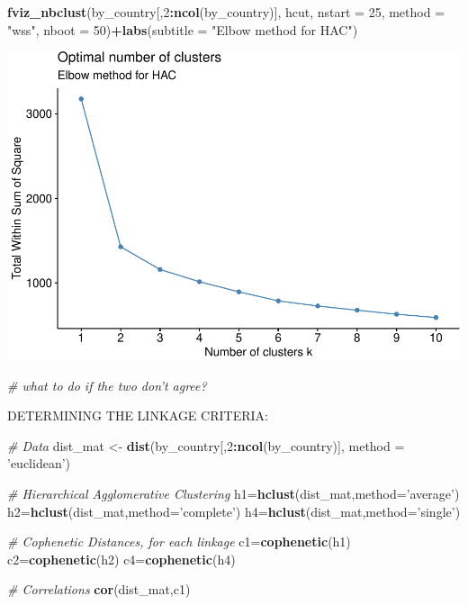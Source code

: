 \documentclass[]{article}
\newenvironment{Shaded}{\begin{snugshade}}{\end{snugshade}}
\newcommand{\CommentTok}[1]{\textcolor[rgb]{0.56,0.35,0.01}{\textit{#1}}}
\newcommand{\DataTypeTok}[1]{\textcolor[rgb]{0.13,0.29,0.53}{#1}}
\newcommand{\DecValTok}[1]{\textcolor[rgb]{0.00,0.00,0.81}{#1}}
\newcommand{\KeywordTok}[1]{\textcolor[rgb]{0.13,0.29,0.53}{\textbf{#1}}}
\newcommand{\NormalTok}[1]{#1}
\newcommand{\OperatorTok}[1]{\textcolor[rgb]{0.81,0.36,0.00}{\textbf{#1}}}
\newcommand{\StringTok}[1]{\textcolor[rgb]{0.31,0.60,0.02}{#1}}
\begin{document}
\begin{Shaded}
\begin{Highlighting}[]
\KeywordTok{fviz_nbclust}\NormalTok{(by_country[,}\DecValTok{2}\OperatorTok{:}\KeywordTok{ncol}\NormalTok{(by_country)], hcut, }\DataTypeTok{nstart =} \DecValTok{25}\NormalTok{,  }\DataTypeTok{method =} \StringTok{"wss"}\NormalTok{, }
             \DataTypeTok{nboot =} \DecValTok{50}\NormalTok{)}\OperatorTok{+}\KeywordTok{labs}\NormalTok{(}\DataTypeTok{subtitle =} \StringTok{"Elbow method for HAC"}\NormalTok{)}
\end{Highlighting}
\end{Shaded}

\includegraphics{eda_files/figure-latex/unnamed-chunk-14-4.pdf}

\begin{Shaded}
\begin{Highlighting}[]
\CommentTok{# what to do if the two don't agree?}
\end{Highlighting}
\end{Shaded}

DETERMINING THE LINKAGE CRITERIA:

\begin{Shaded}
\begin{Highlighting}[]
\CommentTok{# Data}
\NormalTok{dist_mat <-}\StringTok{ }\KeywordTok{dist}\NormalTok{(by_country[,}\DecValTok{2}\OperatorTok{:}\KeywordTok{ncol}\NormalTok{(by_country)], }\DataTypeTok{method =} \StringTok{'euclidean'}\NormalTok{)}

\CommentTok{# Hierarchical Agglomerative Clustering}
\NormalTok{h1=}\KeywordTok{hclust}\NormalTok{(dist_mat,}\DataTypeTok{method=}\StringTok{'average'}\NormalTok{)}
\NormalTok{h2=}\KeywordTok{hclust}\NormalTok{(dist_mat,}\DataTypeTok{method=}\StringTok{'complete'}\NormalTok{)}
\NormalTok{h4=}\KeywordTok{hclust}\NormalTok{(dist_mat,}\DataTypeTok{method=}\StringTok{'single'}\NormalTok{)}

\CommentTok{# Cophenetic Distances, for each linkage}
\NormalTok{c1=}\KeywordTok{cophenetic}\NormalTok{(h1)}
\NormalTok{c2=}\KeywordTok{cophenetic}\NormalTok{(h2)}
\NormalTok{c4=}\KeywordTok{cophenetic}\NormalTok{(h4)}

\CommentTok{# Correlations}
\KeywordTok{cor}\NormalTok{(dist_mat,c1) }
\end{Highlighting}
\end{Shaded}
\end{document}
